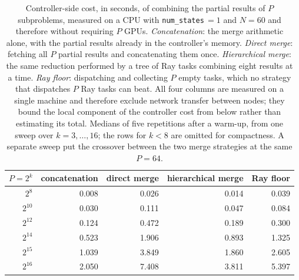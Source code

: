 \documentclass[preprint,12pt,a4paper]{elsarticle}
\begin{document}
\begin{table}[H]
\centering
\small
\begin{tabular}{|r|r|r|r|r|}
\hline
$P=2^{k}$ & concatenation & direct merge & hierarchical merge & Ray floor \\
\hline
$2^{8}$  & 0.008 & 0.026 & 0.014 & 0.039 \\
$2^{10}$ & 0.030 & 0.111 & 0.047 & 0.084 \\
$2^{12}$ & 0.124 & 0.472 & 0.189 & 0.300 \\
$2^{14}$ & 0.523 & 1.906 & 0.893 & 1.325 \\
$2^{15}$ & 1.039 & 3.849 & 1.860 & 2.605 \\
$2^{16}$ & 2.050 & 7.408 & 3.811 & 5.397 \\
\hline
\end{tabular}
\caption{Controller-side cost, in seconds, of combining the partial results of $P$
subproblems, measured on a CPU with \texttt{num\_states}$\,=1$ and $N=60$ and therefore
without requiring $P$ GPUs. \emph{Concatenation}: the merge arithmetic alone, with the partial
results already in the controller's memory. \emph{Direct merge}: fetching all $P$ partial
results and concatenating them once. \emph{Hierarchical merge}: the same reduction performed by
a tree of Ray tasks combining eight results at a time. \emph{Ray floor}: dispatching and
collecting $P$ empty tasks, which no strategy that dispatches $P$ Ray tasks can beat. All four columns are
measured on a single machine and therefore exclude network transfer between nodes; they bound
the local component of the controller cost from below rather than estimating its total. Medians of five
repetitions after a warm-up, from one sweep over $k=3,\dots,16$; the rows for $k<8$ are omitted
for compactness. A separate sweep put the crossover between the two merge strategies at the
same $P=64$.}
\label{tab:controller}
\end{table}
\end{document}
